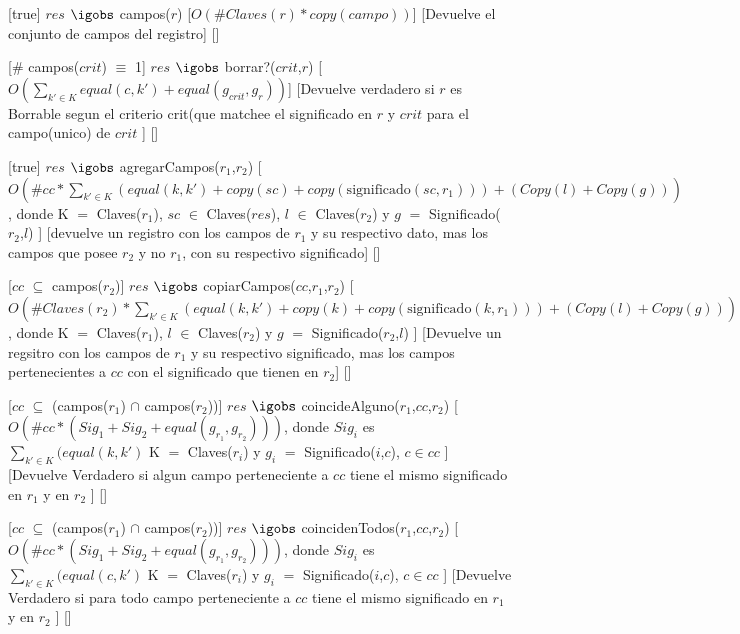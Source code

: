 \begin{Interfaz}
  
  [true] %
  {$res$ $\igobs$ campos($r$)} %
  [$O(\#Claves(r)*copy(campo))$] %
  [Devuelve el conjunto de campos del registro] %
  [] %
  
  [$\#$ campos($crit$) $\equiv$ 1] %
  {$res$ $\igobs$ borrar?($crit$,$r$)} %
  [$O(\sum_{k' \in K}equal(c,k') + equal(g_{crit},g_r))$] %
  [Devuelve verdadero si $r$ es Borrable segun el criterio crit(que matchee el significado en $r$ y $crit$ para el campo(unico) de $crit$ ] %
  [] %
  
  [true] %
  {$res$ $\igobs$ agregarCampos($r_1$,$r_2$)} %
  [$O(\#cc*\sum_{k' \in K}(equal(k,k') + copy(sc) + copy(\text{significado}(sc,r_1)))+(Copy(l) + Copy(g)))$, donde K $=$ Claves($r_1$), $sc$ $\in$ Claves($res$), $l$ $\in$ Claves($r_2$) y $g$ $=$ Significado($r_2$,$l$)  ] %
  [devuelve un registro con los campos de $r_1$ y su respectivo dato, mas los campos que posee $r_2$ y no $r_1$, con su respectivo significado] %
  [] %
  
  [$cc$ $\subseteq$ campos($r_2$)] %
  {$res$ $\igobs$ copiarCampos($cc$,$r_1$,$r_2$)} %
  [$O(\#Claves(r_2)*\sum_{k' \in K}(equal(k,k') + copy(k) + copy(\text{significado}(k,r_1)))+(Copy(l) + Copy(g)))$, donde K $=$ Claves($r_1$), $l$ $\in$ Claves($r_2$) y $g$ $=$ Significado($r_2$,$l$)  ] %
  [Devuelve un regsitro con los campos de $r_1$ y su respectivo significado, mas los campos pertenecientes a $cc$ con el significado que tienen en $r_2$] %
  [] %
  
  [$cc$ $\subseteq$ (campos($r_1$) $\cap$ campos($r_2$))] %
  {$res$ $\igobs$ coincideAlguno($r_1$,$cc$,$r_2$)} %
  [$O(\#cc*(Sig_1 + Sig_2 + equal(g_{r_1},g_{r_2})))$, donde $Sig_i$ es $\sum_{k' \in K}(equal(k,k')$ K $=$ Claves($r_i$) y $g_i$ $=$ Significado($i$,$c$), $c \in cc$  ] %
  [Devuelve Verdadero si algun campo perteneciente a $cc$ tiene el mismo significado en $r_1$ y en $r_2$ ] %
  [] %
  
  [$cc$ $\subseteq$ (campos($r_1$) $\cap$ campos($r_2$))] %
  {$res$ $\igobs$ coincidenTodos($r_1$,$cc$,$r_2$)} %
  [$O(\#cc*(Sig_1 + Sig_2 + equal(g_{r_1},g_{r_2})))$, donde $Sig_i$ es $\sum_{k' \in K}(equal(c,k')$ K $=$ Claves($r_i$) y $g_i$ $=$ Significado($i$,$c$), $c \in cc$ ] %
  [Devuelve Verdadero si para todo campo perteneciente a $cc$ tiene el mismo significado en $r_1$ y en $r_2$ ] %
  [] %


\end{Interfaz}
